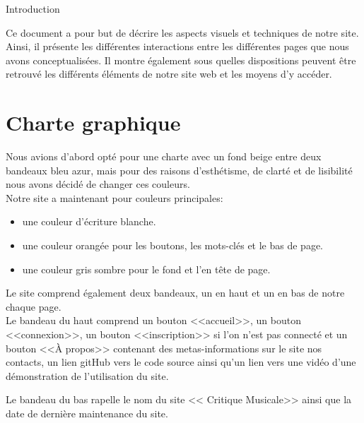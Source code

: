 
{Introduction}

	\begin{paragraphe}
		Ce document a pour but de décrire les aspects visuels et techniques de notre site.
		Ainsi, il présente les différentes interactions entre les différentes pages que nous avons conceptualisées.
		Il montre également sous quelles dispositions peuvent être retrouvé les différents éléments de notre site web et les moyens d'y accéder.
	\end{paragraphe}

\section{Charte graphique}

	\begin{paragraphe}
	    Nous avions d'abord opté pour une charte avec un fond beige entre deux bandeaux bleu azur, mais pour des raisons
	    d'esthétisme, de clarté et de lisibilité nous avons décidé de changer ces couleurs.\\

		Notre site a maintenant pour couleurs principales:
            \begin{itemize}
            \item une couleur d'écriture blanche.
            \item une couleur orangée pour les boutons, les mots-clés et le bas de page.
            \item une couleur gris sombre pour le fond et l'en tête de page.
            \end{itemize}

	\end{paragraphe}

    \begin{paragraphe}
		Le site comprend également deux bandeaux, un en haut et un en bas de notre chaque page.\\
		Le bandeau du haut comprend un bouton <<accueil>>,
		un bouton <<connexion>>, un bouton <<inscription>> si l'on n'est pas connecté et un bouton <<À propos>> contenant des metas-informations sur le site
		nos contacts, un lien gitHub vers le code source ainsi qu'un lien vers une vidéo d'une démonstration de l'utilisation du site.


        Le bandeau du bas rapelle le nom du site << Critique Musicale>> ainsi que la date de dernière maintenance du site.

	\end{paragraphe}

